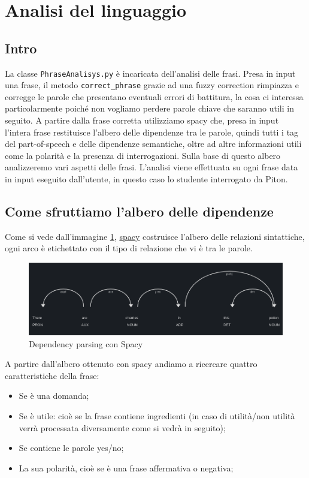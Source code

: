 \section{Analisi del linguaggio}
\subsection{Intro}
La classe \texttt{PhraseAnalisys.py} è incaricata dell'analisi delle frasi.
Presa in input una frase, il metodo \texttt{correct\_phrase} grazie ad una fuzzy correction rimpiazza e corregge le parole che presentano eventuali errori di battitura, la cosa ci interessa particolarmente poiché non vogliamo perdere parole chiave che saranno utili in seguito.
A partire dalla frase corretta  utilizziamo spacy che, presa in input l'intera frase restituisce l'albero delle dipendenze tra le parole, quindi tutti i tag del part-of-speech e delle dipendenze semantiche, oltre ad altre informazioni utili come la polarità e la presenza di interrogazioni. Sulla base di questo albero analizzeremo vari aspetti delle frasi. L'analisi viene effettuata su ogni frase data in input eseguito dall'utente, in questo caso lo studente interrogato da Piton.
\subsection{Come sfruttiamo l'albero delle dipendenze}
Come si vede dall'immagine \ref{fig:Spacy}, \href{https://spacy.io/}{spacy} costruisce l'albero delle relazioni sintattiche, ogni arco è etichettato con il tipo di relazione che vi è tra le parole.
\begin{figure}[h]
    \centering
    \includegraphics[scale=0.45]{Images/imgSpacy.png}
    \caption{Dependency parsing con Spacy}
    \label{fig:Spacy}
\end{figure}
A partire dall'albero ottenuto con spacy andiamo a ricercare quattro caratteristiche della frase:
\begin{itemize}
    \item Se è una domanda;
    \item Se è utile: cioè se la frase contiene ingredienti (in caso di utilità/non utilità verrà processata diversamente come si vedrà in seguito);
    \item Se contiene le parole yes/no;
    \item La sua polarità, cioè se è una frase affermativa o negativa;
\end{itemize}

